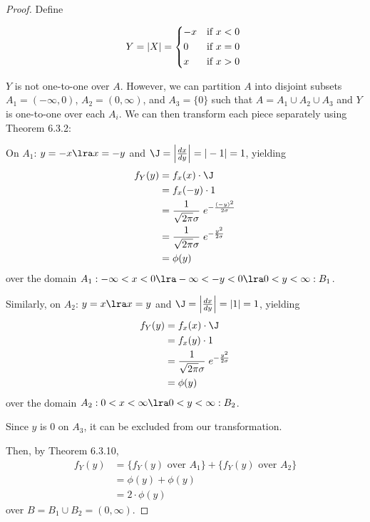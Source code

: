 \message{ !name(properties.tex)}\documentclass{article}
\begin{document}
\begin{itemize}
\begin{proof}
    Define 
    
    \[
    Y = |X| =
    \begin{dcases*}
      -x & if $x < 0$ \\
      0 & if $x = 0$ \\
      x & if $x > 0$ \\
    \end{dcases*}
    \]

    $Y$ is not one-to-one over $A$. However, we can partition $A$ into disjoint
    subsets $A_1 = (-\infty, 0)$, $A_2 = (0, \infty)$, and $A_3 = \{0\}$ such that $A = A_1 \cup A_2
    \cup A_3$ and $Y$ is one-to-one over each $A_i$. We can then transform each piece separately
    using Theorem 6.3.2:

    On $A_1$: $y = -x \lra x = -y$ and $\J = \left| \frac{dx}{dy} \right| = |-1| = 1$, yielding
    \begin{align*}
      f_Y(y) &= f_x(x) \cdot \J\\
      &= f_x(-y) \cdot 1 \\
      &= \frac{1}{\sqrt{2\pi}\sigma} \; e^{-\frac{(-y)^2}{2\sigma}} \\
      &= \frac{1}{\sqrt{2\pi}\sigma} \; e^{-\frac{y^2}{2\sigma}} \\
      &= \phi(y)
    \end{align*}
    over the domain $A_1: -\infty < x < 0 \lra -\infty < -y < 0 \lra 0 < y < \infty :B_1$.

    Similarly, on $A_2$: $y = x \lra x = y$ and $\J = \left| \frac{dx}{dy} \right| = |1| = 1$,
    yielding
    \begin{align*}
      f_Y(y) &= f_x(x) \cdot \J\\
      &= f_x(y) \cdot 1 \\
      &= \frac{1}{\sqrt{2\pi}\sigma} \; e^{-\frac{y^2}{2\sigma}} \\
      &= \phi(y)
    \end{align*}
    over the domain $A_2: 0 < x < \infty \lra 0 < y < \infty :B_2$.

    Since $y$ is 0 on $A_3$, it can be excluded from our transformation.

    Then, by Theorem 6.3.10,
    \begin{align*}
      f_Y(y) &= \{ f_Y(y) \textrm{ over } A_1 \} + \{ f_Y(y) \textrm{ over } A_2 \} \\
      &= \phi(y) + \phi(y) \\
      &= 2 \cdot \phi(y)
    \end{align*}
    over $B = B_1 \cup B_2 = (0, \infty)$.    
  \end{proof}


\end{itemize}
\end{document}
